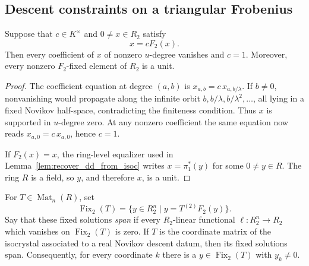 \subsection{Descent constraints on a triangular Frobenius}

\begin{lemma}
  \label{lem:f2_eigen_rigidity}
  \leanok
  Suppose that $c\in K^\times$ and $0\ne x\in R_2$ satisfy
  \[
    x=cF_2(x).
  \]
  Then every coefficient of $x$ of nonzero $u$-degree vanishes and $c=1$.
  Moreover, every nonzero $F_2$-fixed element of $R_2$ is a unit.
\end{lemma}

\begin{proof}
  \leanok
  The coefficient equation at degree $(a,b)$ is
  $x_{a,b}=c\,x_{a,b/\lambda}$.  If $b\ne0$, nonvanishing would propagate along
  the infinite orbit $b,b/\lambda,b/\lambda^2,\ldots$, all lying in a fixed
  Novikov half-space, contradicting the finiteness condition.  Thus $x$ is
  supported in $u$-degree zero.  At any nonzero coefficient the same equation
  now reads $x_{a,0}=c\,x_{a,0}$, hence $c=1$.

  If $F_2(x)=x$, the ring-level equalizer used in
  Lemma~\ref{lem:recover_dd_from_isoc} writes $x=\pi_1^\ast(y)$ for some
  $0\ne y\in R$.  The ring $R$ is a field, so $y$, and therefore $x$, is a
  unit.
\end{proof}

\begin{lemma}
  \label{lem:descent_fixed_solutions_span}
  \leanok
  For $T\in\operatorname{Mat}_n(R)$, set
  \[
    \operatorname{Fix}_2(T)
      =\{y\in R_2^n\mid y=T^{(2)}F_2(y)\}.
  \]
  Say that these fixed solutions \emph{span} if every $R_2$-linear functional
  $\ell\colon R_2^n\to R_2$ which vanishes on $\operatorname{Fix}_2(T)$ is
  zero.  If $T$ is the coordinate matrix of the isocrystal associated to a
  real Novikov descent datum, then its fixed solutions span.  Consequently,
  for every coordinate $k$ there is a $y\in\operatorname{Fix}_2(T)$ with
  $y_k\ne0$.
\end{lemma}


